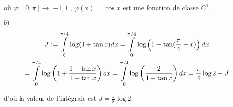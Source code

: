 {\begin{enumerate}
{o\`{u} $\varphi :[0,\pi ]\rightarrow \lbrack -1,1]$, $\varphi
(x)=\cos x$ est une fonction de classe $C^{1}$.

$b)$
\begin{multline*}
J :=\overset{\pi /4}{\underset{0}{\int }}\log (1+\tan x)dx=\overset{\pi /4}{%
\underset{0}{\int }}\log \left(1+\tan (\frac{\pi }{4}-x)\right)dx\\
=\overset{\pi /4}{%
\underset{0}{\int }}\log \left(1+\frac{1-\tan x}{1+\tan x}\right)dx
=\overset{\pi /4}{\underset%
{0}{\int }}\log \left(\frac{2}{1+\tan x}\right)dx =\frac{\pi }{4}\log
2-J
\end{multline*}

d'o\`{u} la valeur de l'int\'{e}grale est $J=\frac{\pi }{8}\log
2.$}
\end{enumerate}
}
